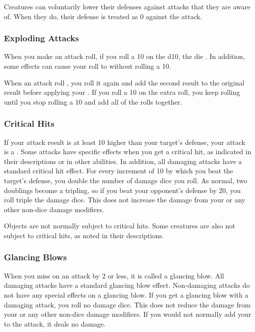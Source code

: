         Creatures can voluntarily lower their defenses against attacks that they are aware of.
        When they do, their defense is treated as 0 against the attack.

        \subsubsection{Exploding Attacks}\label{Exploding Attacks}
            When you make an attack roll, if you roll a 10 on the d10, the die .
            In addition, some effects can cause your roll to  without rolling a 10.

            When an attack roll , you roll it again and add the second result to the original result before applying your .
            If you roll a 10 on the extra roll, you keep rolling until you stop rolling a 10 and add all of the rolls together.

        \subsubsection{Critical Hits}\label{Critical Hits}
            If your attack result is at least 10 higher than your target's defense, your attack is a .
            Some attacks have specific effects when you get a critical hit, as indicated in their descriptions or in other abilities.
            In addition, all damaging attacks have a standard critical hit effect.
            For every increment of 10 by which you beat the target's defense, you double the number of damage dice you roll.
            As normal, two doublings become a tripling, so if you beat your opponent's defense by 20, you roll triple the damage dice.
            This does not increase the damage from your  or any other non-dice damage modifiers.

            Objects are not normally subject to critical hits.
            Some creatures are also not subject to critical hits, as noted in their descriptions.

        \subsubsection{Glancing Blows}\label{Glancing Blows}
            When you miss on an attack by 2 or less, it is called a glancing blow.
            All damaging attacks have a standard glancing blow effect.
            Non-damaging attacks do not have any special effects on a glancing blow.
            If you get a glancing blow with a damaging attack, you roll no damage dice.
            This does not reduce the damage from your  or any other non-dice damage modifiers.
            If you would not normally add your  to the attack, it deals no damage.

